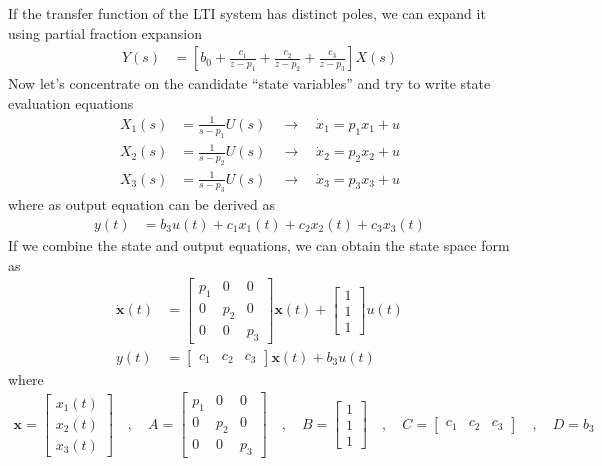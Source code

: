 \documentclass[twoside]{article}
\begin{document}
If the transfer function of the LTI system 
has distinct poles, we can expand it 
using partial fraction expansion 
%
\begin{align*}
Y(s) &= \left[ b_0 + \frac{c_1}{z - p_1} + \frac{c_2}{z - p_2} 
+ \frac{c_3}{z - p_3} \right] X(s)
\end{align*}
%
Now let's concentrate on the candidate ``state variables''
and try to write state evaluation equations
%
\begin{align*}
X_1(s) &= \frac{1}{s - p_1} U(s) \quad \rightarrow \quad \dot{x}_1 =  p_1 x_1+ u
\\
X_2(s) &= \frac{1}{s - p_2} U(s) \quad \rightarrow \quad \dot{x}_2 = p_2 x_2+ u
\\
X_3(s) &= \frac{1}{s - p_3} U(s) \quad \rightarrow \quad \dot{x}_3 = p_3 x_3 + u
\end{align*}
%
where as output equation can be derived as
%
\begin{align*}
y(t) &= b_3 u(t) + c_1 x_1(t) + c_2 x_2(t) + c_3 x_3(t)
\end{align*}
%
If we combine the state and output equations, we
can obtain the state space form as
%
%
\begin{align*}
  \dot{\mathbf{x}}(t) &= \left[ \begin{array}{ccc} p_1 & 0 & 0\\ 0 & p_2 & 0
    \\ 0 & 0 & p_3 \end{array} \right] \mathbf{x}(t)
   + 
  \left[ \begin{array}{c} 1 \\ 1
    \\ 1 \end{array} \right] u(t)
\\
y(t) &= \left[ \begin{array}{ccc} c_1 & c_2 & c_3 \end{array} \right] \mathbf{x}(t)
+ b_3 u(t)
\end{align*}
%
where 
%
\begin{align*}
\mathbf{x} = \left[ \begin{array}{c} x_1(t) \\ x_2(t) \\
x_3(t) \end{array} \right] \quad , \quad
A = \left[ \begin{array}{ccc} p_1 & 0 & 0 \\ 0 & p_2 & 0
    \\ 0 & 0 & p_3 \end{array} \right]
\quad , \quad 
B = \left[ \begin{array}{c} 1 \\ 1
    \\ 1 \end{array} \right]
\quad , \quad
C = \left[ \begin{array}{ccc} c_1 & c_2 & c_3 \end{array} \right]
\quad , \quad
D = b_3
\end{align*}
%
\end{document}
